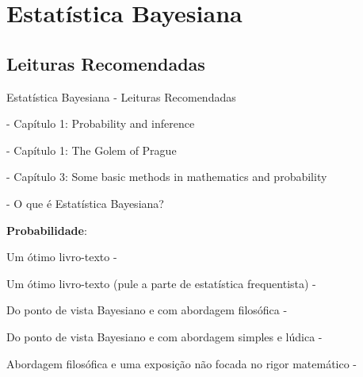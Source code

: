 \section{Estatística Bayesiana}

\subsection{Leituras Recomendadas}
\begin{frame}{Estatística Bayesiana - Leituras Recomendadas}
	\begin{vfilleditems}
		\item \textcite{gelman2013bayesian} - Capítulo 1: Probability and inference
		\item \textcite{mcelreath2020statistical} - Capítulo 1: The Golem of Prague
		\item \textcite{gelman2020regression} - Capítulo 3: Some basic methods in mathematics and probability
		\item \textcite{khanBayesianLearningRule2021}
		\item \textcite{storopoli2021estatisticabayesianaR} - O que é Estatística Bayesiana?
		\item \textbf{Probabilidade}:
		\begin{vfilleditems}
			\item Um ótimo livro-texto - \textcite{bertsekasIntroductionProbability2nd2008}
			\item Um ótimo livro-texto (pule a parte de estatística frequentista) - \textcite{dekkingModernIntroductionProbability2010}
			\item Do ponto de vista Bayesiano e com abordagem filosófica - \textcite{jaynesProbabilityTheoryLogic2003}
			\item Do ponto de vista Bayesiano e com abordagem simples e lúdica - \textcite{kurtBayesianStatisticsFun2019}
			\item Abordagem filosófica e uma exposição não focada no rigor matemático - \textcite{diaconisTenGreatIdeas2019}
		\end{vfilleditems}
	\end{vfilleditems}
\end{frame}

